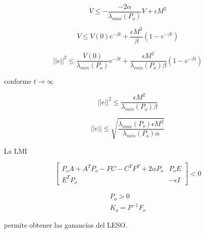 \begin{equation*}
    \dot{V} \leq  - \frac{-2\alpha}{\lambda_{max}(P_o)}V + \epsilon M^2
\end{equation*}

\begin{equation*}
    \dot{V} \leq  V(0)e^{-\beta t} + \frac{\epsilon M^2}{\beta}(1-e^{-\beta t})
\end{equation*}

\begin{equation*}
    ||e||^2 \leq  \frac{V(0)}{\lambda_{min}(P_o)}e^{-\beta t} + \frac{\epsilon M^2}{\lambda_{min}(P_o)\beta}(1-e^{-\beta t})
\end{equation*}

conforme \(t\to \infty\)

\begin{equation*}
    ||e||^2 \leq  \frac{\epsilon M^2}{\lambda_{min}(P_o)\beta}
\end{equation*}

\begin{equation*}
    ||e||\leq  \sqrt{\frac{\lambda_{max}(P_o)\epsilon M^2}{\lambda_{min}(P_o)\alpha}}
\end{equation*}

La LMI

\begin{equation*}
    \begin{bmatrix}
        P_oA+A^TP_o-FC-C^TF^T+2\alpha P_o & P_oE\\
        E^TP_o & -\epsilon I
    \end{bmatrix}<0
\end{equation*}

\begin{equation*}
    \begin{aligned}
        P_o>0\\
        K_o=P^{-1}F_o
    \end{aligned}
\end{equation*}

permite obtener las ganancias del LESO.